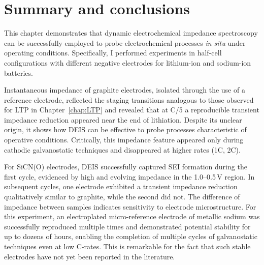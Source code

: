 
\section{Summary and conclusions}

This chapter demonstrates that dynamic electrochemical impedance spectroscopy can be successfully employed to probe electrochemical processes \emph{in situ} under operating conditions. Specifically, I performed experiments in half-cell configurations with different negative electrodes for lithium-ion and sodium-ion batteries.

Instantaneous impedance of graphite electrodes, isolated through the use of a reference electrode, reflected the staging transitions analogous to those observed for LTP in Chapter~\ref{chap:LTP} and revealed that at C/5 a reproducible transient impedance reduction appeared near the end of lithiation.
Despite its unclear origin, it shows how DEIS can be effective to probe processes characteristic of operative conditions.
Critically, this impedance feature appeared only during cathodic galvanostatic techniques and disappeared at higher rates (1C, 2C).

For SiCN(O) electrodes, DEIS successfully captured SEI formation during the first cycle, evidenced by high and evolving impedance in the 1.0--0.5\,V region. 
In subsequent cycles, one electrode exhibited a transient impedance reduction qualitatively similar to graphite, while the second did not. 
The difference of impedance between samples indicates sensitivity to electrode microstructure.
For this experiment, an electroplated micro-reference electrode of metallic sodium was successfully reproduced multiple times and demonstrated potential stability for up to dozens of hours, enabling the completion of multiple cycles of galvanostatic techniques even at low C-rates.
This is remarkable for the fact that such stable electrodes have not yet been reported in the literature.

